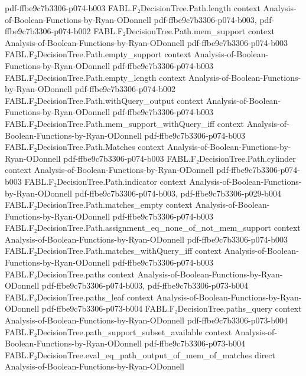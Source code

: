 \begin{theorem}
  {pdf-ffbe9c7b3306-p074-b003}
\proofstep
  {FABL.F₂DecisionTree.Path.length}
  {context}
  {Analysis-of-Boolean-Functions-by-Ryan-ODonnell}
  {pdf-ffbe9c7b3306-p074-b003,
    pdf-ffbe9c7b3306-p074-b002}
\proofstep
  {FABL.F₂DecisionTree.Path.mem_support}
  {context}
  {Analysis-of-Boolean-Functions-by-Ryan-ODonnell}
  {pdf-ffbe9c7b3306-p074-b003}
\proofstep
  {FABL.F₂DecisionTree.Path.empty_support}
  {context}
  {Analysis-of-Boolean-Functions-by-Ryan-ODonnell}
  {pdf-ffbe9c7b3306-p074-b003}
\proofstep
  {FABL.F₂DecisionTree.Path.empty_length}
  {context}
  {Analysis-of-Boolean-Functions-by-Ryan-ODonnell}
  {pdf-ffbe9c7b3306-p074-b002}
\proofstep
  {FABL.F₂DecisionTree.Path.withQuery_output}
  {context}
  {Analysis-of-Boolean-Functions-by-Ryan-ODonnell}
  {pdf-ffbe9c7b3306-p074-b003}
\proofstep
  {FABL.F₂DecisionTree.Path.mem_support_withQuery_iff}
  {context}
  {Analysis-of-Boolean-Functions-by-Ryan-ODonnell}
  {pdf-ffbe9c7b3306-p074-b003}
\proofstep
  {FABL.F₂DecisionTree.Path.Matches}
  {context}
  {Analysis-of-Boolean-Functions-by-Ryan-ODonnell}
  {pdf-ffbe9c7b3306-p074-b003}
\proofstep
  {FABL.F₂DecisionTree.Path.cylinder}
  {context}
  {Analysis-of-Boolean-Functions-by-Ryan-ODonnell}
  {pdf-ffbe9c7b3306-p074-b003}
\proofstep
  {FABL.F₂DecisionTree.Path.indicator}
  {context}
  {Analysis-of-Boolean-Functions-by-Ryan-ODonnell}
  {pdf-ffbe9c7b3306-p074-b003,
    pdf-ffbe9c7b3306-p029-b004}
\proofstep
  {FABL.F₂DecisionTree.Path.matches_empty}
  {context}
  {Analysis-of-Boolean-Functions-by-Ryan-ODonnell}
  {pdf-ffbe9c7b3306-p074-b003}
\proofstep
  {FABL.F₂DecisionTree.Path.assignment_eq_none_of_not_mem_support}
  {context}
  {Analysis-of-Boolean-Functions-by-Ryan-ODonnell}
  {pdf-ffbe9c7b3306-p074-b003}
\proofstep
  {FABL.F₂DecisionTree.Path.matches_withQuery_iff}
  {context}
  {Analysis-of-Boolean-Functions-by-Ryan-ODonnell}
  {pdf-ffbe9c7b3306-p074-b003}
\proofstep
  {FABL.F₂DecisionTree.paths}
  {context}
  {Analysis-of-Boolean-Functions-by-Ryan-ODonnell}
  {pdf-ffbe9c7b3306-p074-b003,
    pdf-ffbe9c7b3306-p073-b004}
\proofstep
  {FABL.F₂DecisionTree.paths_leaf}
  {context}
  {Analysis-of-Boolean-Functions-by-Ryan-ODonnell}
  {pdf-ffbe9c7b3306-p073-b004}
\proofstep
  {FABL.F₂DecisionTree.paths_query}
  {context}
  {Analysis-of-Boolean-Functions-by-Ryan-ODonnell}
  {pdf-ffbe9c7b3306-p073-b004}
\proofstep
  {FABL.F₂DecisionTree.path_support_subset_available}
  {context}
  {Analysis-of-Boolean-Functions-by-Ryan-ODonnell}
  {pdf-ffbe9c7b3306-p073-b004}
\proofstep
  {FABL.F₂DecisionTree.eval_eq_path_output_of_mem_of_matches}
  {direct}
  {Analysis-of-Boolean-Functions-by-Ryan-ODonnell}

\end{theorem}
